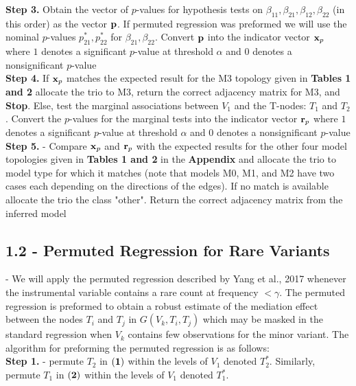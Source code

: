 \documentclass[12pt]{report}
\begin{document}
\noindent \textbf{Step 3.} Obtain the vector of $p$-values for hypothesis tests on $\beta_{11}, \beta_{21}, \beta_{12}, \beta_{22}$ (in this order) as the vector $\bf {p}$. If permuted regression was preformed we will use the nominal $p$-values $p^{\ast}_{21}, p^{\ast}_{22}$ for $\beta_{21}, \beta_{22}$. Convert $\bf {p}$ into the indicator vector ${\bf x}_p$ where $1$ denotes a significant $p$-value at threshold $\alpha$ and $0$ denotes a nonsignificant $p$-value \\


\noindent \textbf{Step 4.} If ${\bf x}_p$ matches the expected result for the M3 topology given in \textbf{Tables 1 and 2} allocate the trio to M3, return the correct adjacency matrix for M3, and \textbf{Stop}. Else, test the marginal associations between $V_1$ and the T-nodes: $T_1$ and $T_2$. Convert the $p$-values for the marginal tests into the indicator vector ${\bf r}_p$  where $1$ denotes a significant $p$-value at threshold $\alpha$ and $0$ denotes a nonsignificant $p$-value \\


\noindent\textbf{Step 5.} - Compare ${\bf x}_p$ and ${\bf r}_p$ with the expected results for the other four model topologies given in \textbf{Tables 1 and 2} in the \textbf{Appendix} and allocate the trio to model type for which it matches (note that models M0, M1, and M2 have two cases each depending on the directions of the edges). If no match is available allocate the trio the class "other". Return the correct adjacency matrix from the inferred model


\subsection*{1.2 - Permuted Regression for Rare Variants} - We will apply the permuted regression described by Yang et al., 2017 whenever the instrumental variable contains a rare count at frequency $< \gamma$. The permuted regression is preformed to obtain a robust estimate of the mediation effect between the nodes $T_i$ and $T_j$ in $G(V_k, T_i, T_j)$ which may be masked in the standard regression when $V_k$ contains few observations for the minor variant. The algorithm for preforming the permuted regression is as follows:\\

\noindent \textbf{Step 1.} - permute $T_2$ in $\bf (1)$ within the levels of $V_1$ denoted $T_2^{\ast}$. Similarly, permute $T_1$ in $\bf (2)$ within the levels of $V_1$ denoted $T_1^{\ast}$.
 
\end{document}
